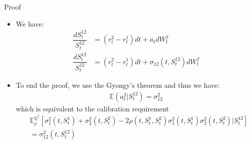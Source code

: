 \documentclass[10pt]{beamer} %
\begin{document}
    \begin{frame}[t]{Proof}
    \begin{itemize}
    \item <+-> We have:
    \begin{align*}
        \dfrac{dS^{12}_{t}}{S^{12}_{t}} &= (r_t^{2} - r_t^{1}) dt + a_t dW_t^f\\
        \dfrac{dS^{12}_{t}}{S^{12}_{t}} &= (r_t^{2} - r_t^{1}) dt + \sigma_{12}(t,S_t^{12}) dW_t^f
    \end{align*}
    \item<+->To end the proof, we use the Gyongy's theorem and thus we have:
    \begin{align*}
    	\mathbb{E}(a_t^2 | S_t^{12}) = \sigma_{12}^2
    \end{align*}
    which is equivalent to the calibration requirement
\begin{align*}
            & \mathbb{E}^{\mathbb{Q}^f}_{\rho} \left[ \sigma_1^2(t, S_t^1) + \sigma_2^2(t, S_t^2) - 2\rho(t, S_t^1, S_t^2)\sigma_1^2(t, S_t^1)\sigma_2^2(t, S_t^2)|S_t^{12} \right] \\
            & = \sigma_{12}^2(t, S_t^{12})
            \end{align*}
    \end{itemize} 
    \end{frame}
\end{document}
